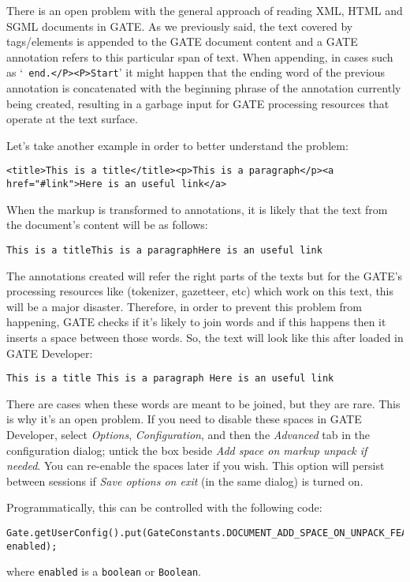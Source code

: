 There is an open problem with the general approach of reading XML, HTML and SGML
documents in GATE. As we previously said, the text covered by tags/elements is
appended to the GATE document content and a GATE annotation refers to this
particular span of text. When appending, in cases such as `{\tt
end.</P><P>Start}' it might happen that the ending word of the previous
annotation is concatenated with the beginning phrase of the annotation currently
being created, resulting in a garbage input for GATE processing resources that
operate at the text surface.

Let's take another example in order to better understand the
problem:

\small
\begin{small}
\begin{verbatim}
<title>This is a title</title><p>This is a paragraph</p><a
href="#link">Here is an useful link</a>
\end{verbatim}
\end{small}
\nnormalsize

When the markup is transformed to annotations, it is likely that
the text from the document's content will be as follows:

{\tt This is a titleThis is a paragraphHere is an useful link}

The annotations created will refer the right parts of the texts
but for the GATE's processing resources like (tokenizer, gazetteer,
etc) which work on this text, this will be a major disaster.
Therefore, in order to prevent this problem from happening, GATE
checks if it's likely to join words and if this happens then it
inserts a space between those words. So, the text will look like
this after loaded in GATE Developer:

{\tt This is a title This is a paragraph Here is an useful link}

There are cases when these words are meant to be joined, but they are rare. This
is why it's an open problem.  If you need to disable these spaces in GATE
Developer, select \emph{Options}, \emph{Configuration}, and then the
\emph{Advanced} tab in the configuration dialog; untick the box beside \emph{Add
  space on markup unpack if needed}.  You can re-enable the spaces later if you
wish.  This option will persist between sessions if \emph{Save options on exit}
(in the same dialog) is turned on.

Programmatically, this can be controlled with the following code:
%
\begin{verbatim}
Gate.getUserConfig().put(GateConstants.DOCUMENT_ADD_SPACE_ON_UNPACK_FEATURE_NAME,
enabled);
\end{verbatim}
%
where \texttt{enabled} is a \texttt{boolean} or \texttt{Boolean}.


